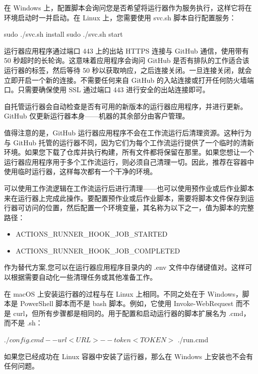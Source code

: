 在 Windows 上，配置脚本会询问您是否希望将运行器作为服务执行，这样它将在环境启动时一并启动。在 Linux 上，您需要使用 svc.sh 脚本自行配置服务：

\begin{shell}
sudo ./svc.sh install
sudo ./svc.sh start
\end{shell}


运行器应用程序通过端口 443 上的出站 HTTPS 连接与 GitHub 通信，使用带有 50 秒超时的长轮询。这意味着应用程序会询问 GitHub 是否有排队的工作适合该运行器的标签，然后等待 50 秒以获取响应，之后连接关闭。一旦连接关闭，就会立即开启一个新的连接。不需要任何来自 GitHub 的入站连接或打开任何防火墙端口。只需要确保使用 SSL 通过端口 443 进行安全的出站连接即可。


自托管运行器会自动检查是否有可用的新版本的运行器应用程序，并进行更新。GitHub 仅更新运行器本身——机器的其余部分由客户管理。


值得注意的是，GitHub 运行器应用程序不会在工作流运行后清理资源。这种行为与 GitHub 托管的运行器不同，因为它们为每个工作流运行提供了一个临时的清新环境。如果您下载了仓库并执行构建，所有文件都将保留在那里。如果您想让一个运行器应用程序用于多个工作流运行，则必须自己清理一切。因此，推荐在容器中使用临时运行器，这样每次都有一个干净的环境。

可以使用工作流逻辑在工作流运行后进行清理——也可以使用预作业或后作业脚本来在运行器上完成此操作。要配置预作业或后作业脚本，需要将脚本文件保存到运行器可访问的位置，然后配置一个环境变量，其名称为以下之一，值为脚本的完整路径：

\begin{itemize}
\item 
ACTIONS\_RUNNER\_HOOK\_JOB\_STARTED

\item 
ACTIONS\_RUNNER\_HOOK\_JOB\_COMPLETED
\end{itemize}

作为替代方案,您可以在运行器应用程序目录内的 .env 文件中存储键值对。这样可以根据需要自动化一些清理任务或其他准备工作。


在 macOS 上安装运行器的过程与在 Linux 上相同。不同之处在于 Windows，脚本是 PowerShell 脚本而不是 bash 脚本。例如，它使用 Invoke-WebRequest 而不是 curl，但所有步骤都是相同的。用于配置和启动运行器的脚本扩展名为 .cmd，而不是 .sh：

\begin{shell}
$ ./config.cmd --url <URL> --token <TOKEN>
$ ./run.cmd
\end{shell}

如果您已经成功在 Linux 容器中安装了运行器，那么在 Windows 上安装也不会有任何问题。

